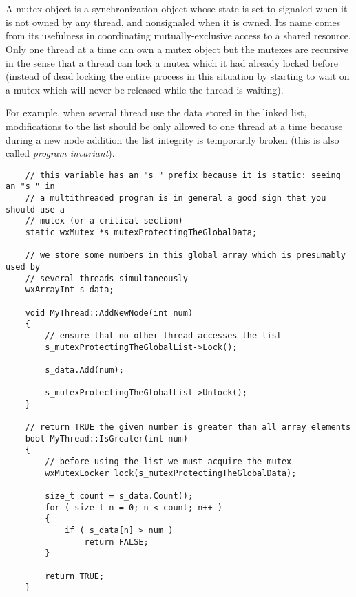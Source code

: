 \section{}\label{wxmutex}

A mutex object is a synchronization object whose state is set to signaled when
it is not owned by any thread, and nonsignaled when it is owned. Its name comes
from its usefulness in coordinating mutually-exclusive access to a shared
resource. Only one thread at a time can own a mutex object but the mutexes are
recursive in the sense that a thread can lock a mutex which it had already
locked before (instead of dead locking the entire process in this situation by
starting to wait on a mutex which will never be released while the thread is
waiting).

For example, when several thread use the data stored in the linked list,
modifications to the list should be only allowed to one thread at a time
because during a new node addition the list integrity is temporarily broken
(this is also called {\it program invariant}).


{\small%
\begin{verbatim}
    // this variable has an "s_" prefix because it is static: seeing an "s_" in
    // a multithreaded program is in general a good sign that you should use a
    // mutex (or a critical section)
    static wxMutex *s_mutexProtectingTheGlobalData;

    // we store some numbers in this global array which is presumably used by
    // several threads simultaneously
    wxArrayInt s_data;

    void MyThread::AddNewNode(int num)
    {
        // ensure that no other thread accesses the list
        s_mutexProtectingTheGlobalList->Lock();

        s_data.Add(num);

        s_mutexProtectingTheGlobalList->Unlock();
    }

    // return TRUE the given number is greater than all array elements
    bool MyThread::IsGreater(int num)
    {
        // before using the list we must acquire the mutex
        wxMutexLocker lock(s_mutexProtectingTheGlobalData);

        size_t count = s_data.Count();
        for ( size_t n = 0; n < count; n++ )
        {
            if ( s_data[n] > num )
                return FALSE;
        }

        return TRUE;
    }
\end{verbatim}
}

